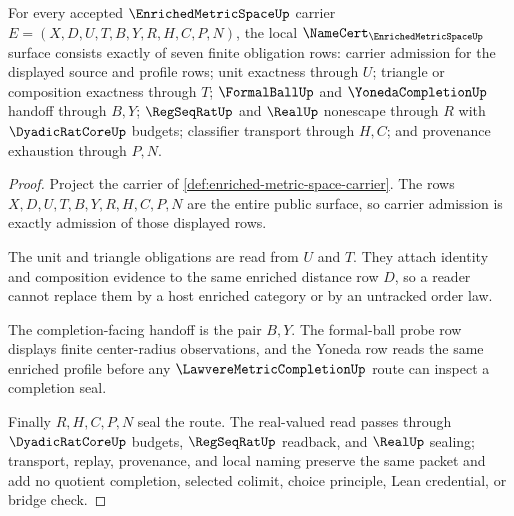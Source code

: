 \begin{theorem}
\label{thm:enriched-metric-space-namecert-obligations}
For every accepted $\EnrichedMetricSpaceUp$ carrier $E=(X,D,U,T,B,Y,R,H,C,P,N)$, the local $\NameCert_{\EnrichedMetricSpaceUp}$ surface consists exactly of seven finite obligation rows: carrier admission for the displayed source and profile rows; unit exactness through $U$; triangle or composition exactness through $T$; $\FormalBallUp$ and $\YonedaCompletionUp$ handoff through $B,Y$; $\RegSeqRatUp$ and $\RealUp$ nonescape through $R$ with $\DyadicRatCoreUp$ budgets; classifier transport through $H,C$; and provenance exhaustion through $P,N$.
\end{theorem}
\begin{proof}
Project the carrier of \autoref{def:enriched-metric-space-carrier}. The rows $X,D,U,T,B,Y,R,H,C,P,N$ are the entire public surface, so carrier admission is exactly admission of those displayed rows.

The unit and triangle obligations are read from $U$ and $T$. They attach identity and composition evidence to the same enriched distance row $D$, so a reader cannot replace them by a host enriched category or by an untracked order law.

The completion-facing handoff is the pair $B,Y$. The formal-ball probe row displays finite center-radius observations, and the Yoneda row reads the same enriched profile before any $\LawvereMetricCompletionUp$ route can inspect a completion seal.

Finally $R,H,C,P,N$ seal the route. The real-valued read passes through $\DyadicRatCoreUp$ budgets, $\RegSeqRatUp$ readback, and $\RealUp$ sealing; transport, replay, provenance, and local naming preserve the same packet and add no quotient completion, selected colimit, choice principle, Lean credential, or bridge check.
\end{proof}

